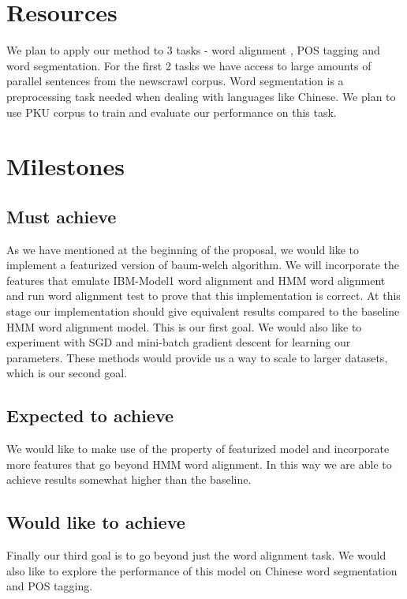 \documentclass[11pt]{article}
\begin{document}
\section{Resources}
We plan to apply our method to 3 tasks - word alignment , POS tagging and word segmentation. For the first 2 tasks we have access to large amounts of parallel sentences from the newscrawl corpus. Word segmentation is a preprocessing task needed when dealing with languages like Chinese. We plan to use PKU corpus to train and evaluate our performance on this task.

\section{Milestones}
\subsection{Must achieve}
As we have mentioned at the beginning of the proposal, we would like to implement a featurized version of baum-welch algorithm. We will incorporate the features that emulate IBM-Model1 word alignment and HMM word alignment and run word alignment test to prove that this implementation is correct. At this stage our implementation should give equivalent results compared to the baseline HMM word alignment model. This is our first goal. We would also like to experiment with SGD and mini-batch gradient descent for learning our parameters. These methods would provide us a way to scale to larger datasets, which is our second goal.

\subsection{Expected to achieve}
We would like to make use of the property of featurized model and incorporate more features that go beyond HMM word alignment. In this way we are able to achieve results somewhat higher than the baseline.

\subsection{Would like to achieve}
Finally our third goal is to go beyond just the word alignment task. We would also like to explore the performance of this model on Chinese word segmentation and POS tagging.
\end{document}
